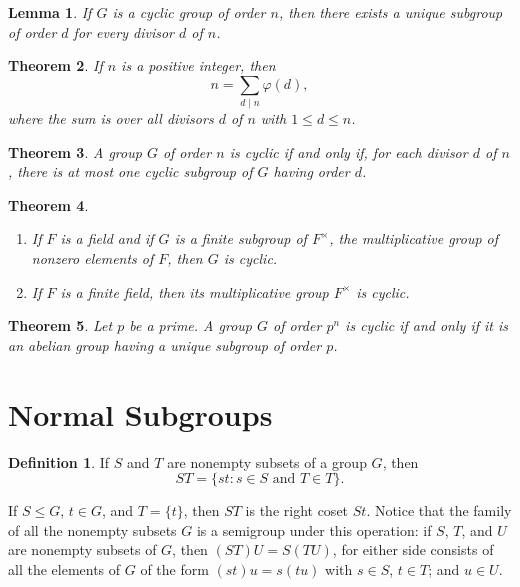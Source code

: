 \documentclass[10pt]{report}
\newtheorem{theorem}{Theorem}[chapter]
\newtheorem{lemma}[theorem]{Lemma}
\theoremstyle{definition}
\newtheorem*{definition}{Definition}
\renewcommand{\labelenumi}{\textnormal{(\roman{enumi})}}
\begin{document}
\begin{lemma}
	If $G$ is a cyclic group of order $n$, then there exists a unique subgroup of order $d$ for every divisor $d$ of $n$.
\end{lemma}

\begin{theorem}
	If $n$ is a positive integer, then
	\[ n=\sum_{d\mid n} \varphi(d), \]
	where the sum is over all divisors $d$ of $n$ with $1\leq d\leq n$.
\end{theorem}

\begin{theorem}
	A group $G$ of order $n$ is cyclic if and only if, for each divisor $d$ of $n$, there is at most one cyclic subgroup of $G$ having order $d$.
\end{theorem}

\begin{theorem}
	\quad
	\renewcommand{\labelenumi}{\textnormal{(\roman{enumi})}}
	\begin{enumerate}
		\item If $F$ is a field and if $G$ is a finite subgroup of $F^\times$, the multiplicative group of nonzero elements of $F$, then $G$ is cyclic.
		\item If $F$ is a finite field, then its multiplicative group $F^\times$ is cyclic.
	\end{enumerate}
\end{theorem}

\begin{theorem}
	Let $p$ be a prime. A group $G$ of order $p^n$ is cyclic if and only if it is an abelian group having a unique subgroup of order $p$.
\end{theorem}


\section{Normal Subgroups}

\begin{definition}
	If $S$ and $T$ are nonempty subsets of a group $G$, then \[ ST=\{st:s\in S\text{ and }T\in T\}.\]\par
	If $S\leq G$, $t\in G$, and $T=\{t\}$, then $ST$ is the right coset $St$.
	Notice that the family of all the nonempty subsets $G$ is a semigroup under this operation: if $S$, $T$, and $U$ are nonempty subsets of $G$,
	then $(ST)U=S(TU)$, for either side consists of all the elements of $G$ of the form $(st)u=s(tu)$ with $s\in S$, $t\in T$; and $u\in U$.
\end{definition}
\end{document}
